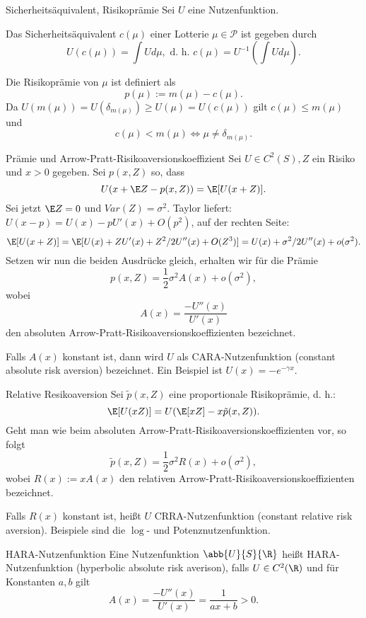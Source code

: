 \begin{karte}{Sicherheitsäquivalent, Risikoprämie}
Sei \(U\) eine Nutzenfunktion. 

Das Sicherheitsäquivalent \(c(\mu)\) einer Lotterie \(\mu\in \mathcal{P}\) ist gegeben durch 
\[ U(c(\mu)) = \int U d\mu, \text{ d. h. } c(\mu) = U^{-1}(\int U d\mu). \]

Die Risikoprämie von \(\mu\) ist definiert als 
\[ p(\mu) := m(\mu) - c(\mu). \]
Da \(U(m(\mu)) = U(\delta_{m(\mu)}) \geq U(\mu) = U(c(\mu))\) gilt \(c(\mu) \leq m(\mu)\) und 
\[ c(\mu) < m(\mu) \Leftrightarrow \mu \neq \delta_{m(\mu)}. \]
\end{karte}

\begin{karte}{Prämie und Arrow-Pratt-Risikoaversionskoeffizient}
Sei \(U\in C^2(S), Z\) ein Risiko und \(x>0\) gegeben. Sei 
\(p(x,Z)\) so, dass 
\[ U(x+\E Z - p(x,Z)) = \E[U(x+Z)]. \]
Sei jetzt \(\E Z = 0\) und \(Var(Z) = \sigma^2\). Taylor liefert: 
\(U(x-p) = U(x) - p U'(x) + O(p^2)\), auf der rechten Seite: 
\[ \E[U(x+Z)] = \E[U(x)+Z U'(x) + Z^2/2 U''(x) + O(Z^3)] = U(x) + \sigma^2/2 U''(x) + o(\sigma^2). \]
Setzen wir nun die beiden Ausdrücke gleich, erhalten wir für die Prämie 
\[ p(x,Z) = \frac{1}{2} \sigma^2 A(x) + o(\sigma^2), \]
wobei 
\[ A(x) = \frac{-U''(x)}{U'(x)} \] 
den absoluten Arrow-Pratt-Risikoaversionskoeffizienten bezeichnet.

Falls \(A(x)\) konstant ist, dann wird \(U\) als CARA-Nutzenfunktion (constant absolute risk aversion)
bezeichnet. Ein Beispiel ist \(U(x) = -e^{-\gamma x}\).
\end{karte}

\begin{karte}{Relative Resikoaversion}
Sei \(\tilde{p}(x,Z)\) eine proportionale Risikoprämie, d. h.: 
\[ \E[U(xZ)] = U(\E[xZ] - x\tilde{p}(x,Z)). \]
Geht man wie beim absoluten Arrow-Pratt-Risikoaversionskoeffizienten vor, so folgt 
\[ \tilde{p}(x,Z) = \frac{1}{2} \sigma^2 R(x) + o(\sigma^2), \]
wobei \(R(x) := xA(x)\) den relativen Arrow-Pratt-Risikoaversionskoeffizienten bezeichnet.

Falls \(R(x)\) konstant ist, heißt \(U\) CRRA-Nutzenfunktion (constant relative risk aversion). 
Beispiele sind die \(\log\)- und Potenznutzenfunktion.
\end{karte}

\begin{karte}{HARA-Nutzenfunktion}
Eine Nutzenfunktion \(\abb{U}{S}{\R}\) heißt HARA-Nutzenfunktion (hyperbolic absolute risk averison), 
falls \(U\in C^2(\R)\) und für Konstanten \(a,b\) gilt 
\[ A(x) = \frac{-U''(x)}{U'(x)} = \frac{1}{ax+b} > 0. \]
\end{karte}

